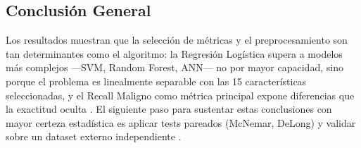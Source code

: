 \documentclass[journal]{IEEEtran}
\begin{document}
\subsection{Conclusión General}
Los resultados muestran que la selección de métricas y el preprocesamiento son tan determinantes como el algoritmo: la Regresión Logística supera a modelos más complejos —SVM, Random Forest, ANN— no por mayor capacidad, sino porque el problema es linealmente separable con las 15 características seleccionadas, y el Recall Maligno como métrica principal expone diferencias que la exactitud oculta \cite{hossin2015, sokolova2009}. El siguiente paso para sustentar estas conclusiones con mayor certeza estadística es aplicar tests pareados (McNemar, DeLong) y validar sobre un dataset externo independiente \cite{hastie2009}.

\end{document}
